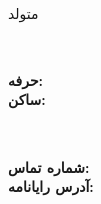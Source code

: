 \documentclass{./../../../../src/latex/classes/resume}
\begin{document}
\iftoggle{Dev}{\par}{}
\noindent\parbox{56mm}
{\parbox{56mm}{\centering\Huge\bfseries\color{cyan}\fullName}\\\parbox{56mm}{\centering متولد \bornData}}\parbox{2mm}{\ }\parbox{65mm}
{\textbf{حرفه:} \ProfessionI\\\textbf{ساکن:} \fullAddress}\parbox{2mm}{\ }\parbox{65mm}
{\textbf{شماره تماس:} \mobilePhoneI\\\textbf{آدرس رایانامه:} \emailI}

\descriptions

\craft

\workExperience

\teaching

\project

\education

\publication

\LicensesCertifications

\honorsAwards

\training
\end{document}
